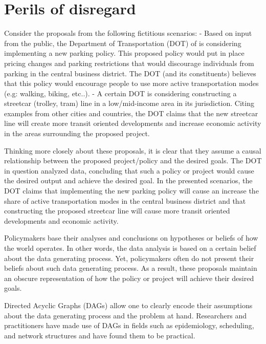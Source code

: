 \section{Perils of disregard}
\label{sec:graph-importance}

Consider the proposals from the following fictitious scenarios: 
- Based on input from the public, the Department of Transportation (DOT) of  is considering implementing a new parking policy. 
This proposed policy would put in place pricing changes and parking restrictions that would discourage individuals from parking in the central business district. 
The DOT (and its constituents) believes that this policy would encourage people to use more active transportation modes (e.g: walking, biking, etc..).
- A certain DOT is considering constructing a streetcar (trolley, tram) line in a low/mid-income area in its jurisdiction.
Citing examples from other cities and countries, the DOT claims that the new streetcar line will create more transit oriented
developments and increase economic activity in the areas surrounding the proposed project. 


Thinking more closely about these proposals, it is clear that they assume a causal relationship between the proposed project/policy and the desired goals. 
The DOT in question analyzed data, concluding that such a policy or project would cause the desired output and achieve the desired goal.
In the presented scenarios, the DOT claims that implementing the new parking policy will cause an increase the share of 
active transportation modes in the central business district and that constructing the proposed streetcar line will 
cause more transit oriented developments and economic activity.

Policymakers base their analyses and conclusions on hypotheses or beliefs of how the world operates.
In other words, the data analysis is based on a certain belief about the data generating process.
Yet, policymakers often do not present their beliefs about such data generating process.
As a result, these proposals maintain an obscure representation of how the policy or project will achieve their desired goals. 

Directed Acyclic Graphs (DAGs) allow one to clearly encode their assumptions about the data generating process and the problem at hand.
Researchers and practitioners have made use of DAGs in fields such as epidemiology, scheduling, and network structures and have found them to be practical.

